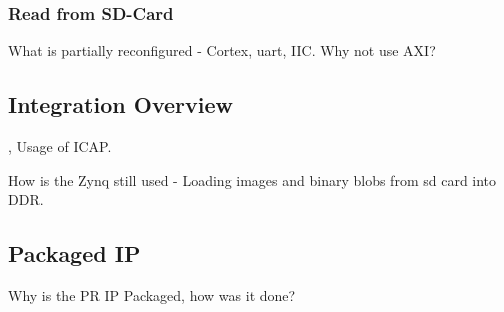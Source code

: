 \subsubsection{Read from SD-Card}
What is partially reconfigured - Cortex, uart, IIC.
Why not use AXI?

\subsection{Integration Overview}
\cite{xilinx_vivado_2018-1}, \cite{xilinx_vivado_2018}
Usage of \gls{ICAP}.

How is the Zynq still used - Loading images and binary blobs from sd card into DDR.

\subsection{Packaged IP}
Why is the PR IP Packaged, how was it done? \cite{xilinx_ug1118-vivado-creating-packaging-custom-ip.pdf_nodate}
